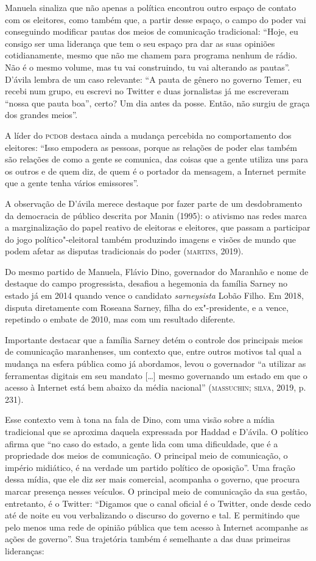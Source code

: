 Manuela sinaliza que não apenas a política encontrou outro espaço de
contato com os eleitores, como também que, a partir desse espaço, o
campo do poder vai conseguindo modificar pautas dos meios de comunicação
tradicional: ``Hoje, eu consigo ser uma liderança que tem o seu espaço
pra dar as suas opiniões cotidianamente, mesmo que não me chamem para
programa nenhum de rádio. Não é o mesmo volume, mas tu vai construindo,
tu vai alterando as pautas''. D'ávila lembra de um caso relevante: ``A
pauta de gênero no governo Temer, eu recebi num grupo, eu escrevi no
Twitter e duas jornalistas já me escreveram ``nossa que pauta
boa'', certo? Um dia antes da posse. Então, não surgiu de graça dos
grandes meios''.

A líder do \textsc{pcdob} destaca ainda a mudança percebida no comportamento
dos eleitores: ``Isso empodera as pessoas, porque as relações de poder
elas também são relações de como a gente se comunica, das coisas que a
gente utiliza uns para os outros e de quem diz, de quem é o portador da
mensagem, a Internet permite que a gente tenha vários emissores''.

A observação de D'ávila merece destaque por fazer parte de um
desdobramento da democracia de público descrita por Manin (1995): o
ativismo nas redes marca a marginalização do papel reativo de eleitoras
e eleitores, que passam a participar do jogo político"-eleitoral também
produzindo imagens e visões de mundo que podem afetar as disputas
tradicionais do poder (\textsc{martins}, 2019).

Do mesmo partido de Manuela, Flávio Dino, governador do Maranhão e nome
de destaque do campo progressista, desafiou a hegemonia da família
Sarney no estado já em 2014 quando vence o candidato \textit{sarneysista} Lobão
Filho. Em 2018, disputa diretamente com Roseana Sarney, filha do
ex"-presidente, e a vence, repetindo o embate de 2010, mas com um
resultado diferente.

Importante destacar que a família Sarney detém o controle dos principais
meios de comunicação maranhenses, um contexto que, entre outros motivos
tal qual a mudança na esfera pública como já abordamos, levou o
governador ``a utilizar as ferramentas digitais em seu mandato {[}\ldots{}{]}
mesmo governando um estado em que o acesso à Internet está bem abaixo da
média nacional'' (\textsc{massuchin}; \textsc{silva}, 2019, p.\,231).

Esse contexto vem à tona na fala de Dino, com uma visão sobre a mídia
tradicional que se aproxima daquela expressada por Haddad e D'ávila. O
político afirma que ``no caso do estado, a gente lida com uma
dificuldade, que é a propriedade dos meios de comunicação. O principal
meio de comunicação, o império midiático, é na verdade um partido
político de oposição''. Uma fração dessa mídia, que ele diz ser mais
comercial, acompanha o governo, que procura marcar presença nesses
veículos. O principal meio de comunicação da sua gestão, entretanto, é o
Twitter: ``Digamos que o canal oficial é o Twitter, onde
desde cedo até de noite eu vou verbalizando o discurso do governo e tal.
E permitindo que pelo menos uma rede de opinião pública que tem acesso à
Internet acompanhe as ações de governo''. Sua trajetória também é
semelhante a das duas primeiras lideranças:


